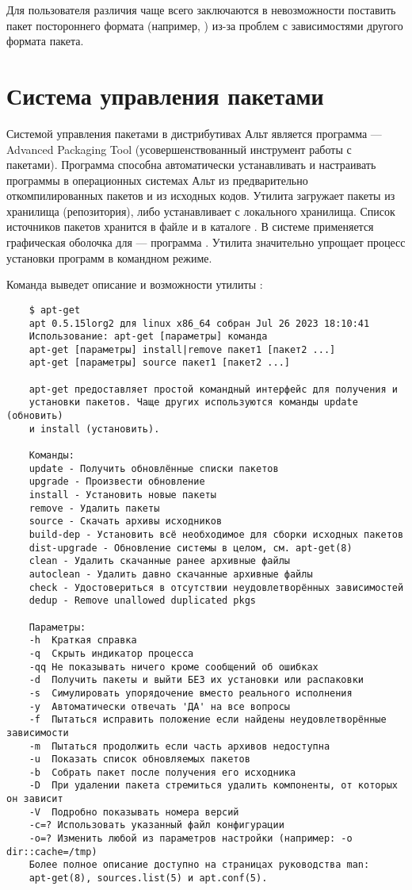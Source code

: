 Для пользователя различия чаще всего заключаются в невозможности поставить пакет постороннего формата (например, ) из-за проблем с зависимостями другого формата пакета. 

\section{Система управления пакетами}
Системой управления пакетами в дистрибутивах Альт является программа  --- Advanced Packaging Tool (усовершенствованный инструмент работы с пакетами). Программа  способна автоматически устанавливать и настраивать программы в операционных системах Альт из предварительно откомпилированных пакетов и из исходных кодов. Утилита загружает пакеты из хранилища (репозитория), либо устанавливает с локального хранилища. Список источников пакетов хранится в файле  и в каталоге . В системе  применяется графическая оболочка для  --- программа . Утилита  значительно упрощает процесс установки программ в командном режиме.

Команда  выведет описание и возможности утилиты :
\begin{verbatim}
	$ apt-get
	apt 0.5.15lorg2 для linux x86_64 собран Jul 26 2023 18:10:41
	Использование: apt-get [параметры] команда
	apt-get [параметры] install|remove пакет1 [пакет2 ...]
	apt-get [параметры] source пакет1 [пакет2 ...]
	
	apt-get предоставляет простой командный интерфейс для получения и
	установки пакетов. Чаще других используются команды update (обновить)
	и install (установить).
	
	Команды:
	update - Получить обновлённые списки пакетов
	upgrade - Произвести обновление
	install - Установить новые пакеты
	remove - Удалить пакеты
	source - Скачать архивы исходников
	build-dep - Установить всё необходимое для сборки исходных пакетов
	dist-upgrade - Обновление системы в целом, см. apt-get(8)
	clean - Удалить скачанные ранее архивные файлы
	autoclean - Удалить давно скачанные архивные файлы
	check - Удостовериться в отсутствии неудовлетворённых зависимостей
	dedup - Remove unallowed duplicated pkgs
	
	Параметры:
	-h  Краткая справка
	-q  Скрыть индикатор процесса
	-qq Не показывать ничего кроме сообщений об ошибках
	-d  Получить пакеты и выйти БЕЗ их установки или распаковки
	-s  Симулировать упорядочение вместо реального исполнения
	-y  Автоматически отвечать 'ДА' на все вопросы
	-f  Пытаться исправить положение если найдены неудовлетворённые зависимости
	-m  Пытаться продолжить если часть архивов недоступна
	-u  Показать список обновляемых пакетов
	-b  Собрать пакет после получения его исходника
	-D  При удалении пакета стремиться удалить компоненты, от которых он зависит
	-V  Подробно показывать номера версий
	-c=? Использовать указанный файл конфигурации
	-o=? Изменить любой из параметров настройки (например: -o dir::cache=/tmp)
	Более полное описание доступно на страницах руководства man:
	apt-get(8), sources.list(5) и apt.conf(5).
\end{verbatim}


